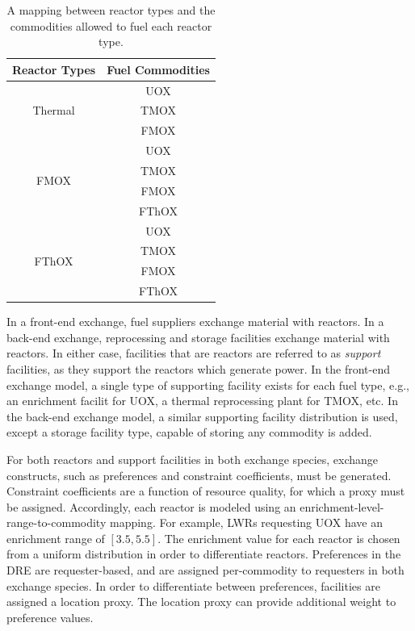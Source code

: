 \documentclass{anstrans}
\begin{document}
\begin{table}[]
\centering
\caption{A mapping between reactor types and the commodities allowed to fuel 
  each reactor type.}
\label{tbl:rx_to_commods}
\begin{tabular}{|c|c|}
\hline
\textbf{Reactor Types}            & \textbf{Fuel Commodities} \\ \hline
\multirow{3}{*}{Thermal}                    & UOX         \\ 
                      & TMOX        \\  
                      & FMOX       \\ \hline
\multirow{4}{*}{FMOX}  & UOX         \\  
                      & TMOX        \\ 
                      & FMOX        \\  
                      & FThOX        \\ \hline 
\multirow{4}{*}{FThOX} & UOX         \\  
                     & TMOX        \\ 
                      & FMOX        \\  
                      & FThOX        \\ \hline 
\end{tabular}
\end{table}

In a front-end exchange, fuel suppliers exchange material with reactors. In a
back-end exchange, reprocessing and storage facilities exchange material with
reactors. In either case, facilities that are  reactors are referred
to as \textit{support} facilities, as they support the reactors which generate
power. In the front-end exchange model, a single type of supporting facility
exists for each fuel type, e.g., an enrichment facilit for UOX, a thermal
reprocessing plant for TMOX, etc. In the back-end exchange model, a similar
supporting facility distribution is used, except a storage facility type,
capable of storing any commodity is added.

For both reactors and support facilities in both exchange species, exchange
constructs, such as preferences and constraint coefficients, must be
generated. Constraint coefficients are a function of resource quality, for which
a proxy must be assigned. Accordingly, each reactor is modeled using an
enrichment-level-range-to-commodity mapping. For example, LWRs requesting UOX
have an enrichment range of $[3.5, 5.5]$. The enrichment value for each reactor
is chosen from a uniform distribution in order to differentiate
reactors. Preferences in the DRE are requester-based, and are assigned
per-commodity to requesters in both exchange species. In order to differentiate
between preferences, facilities are assigned a location proxy. The location
proxy can provide additional weight to preference values.
\end{document}
